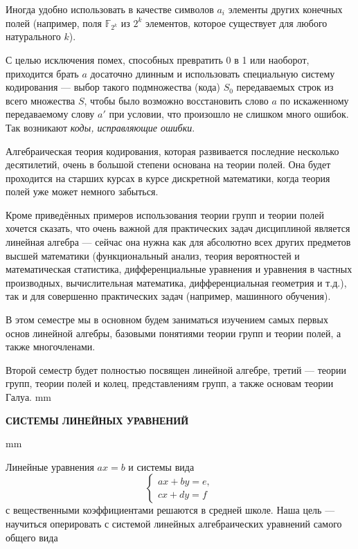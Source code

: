 \documentclass[12pt,english,russian]{article}
\begin{document}
	Иногда удобно использовать в качестве символов $a_i$ элементы других конечных полей (например, поля $\mathbb F_{2^k}$
	из $2^k$ элементов, которое существует для любого натурального $k$).

	С целью исключения помех, способных превратить 0 в 1 или
	наоборот, приходится брать $a$ досаточно длинным и использовать
	специальную систему кодирования --- выбор такого подмножества (кода)
	$S_0$ передаваемых строк из всего множества $S$, чтобы было возможно восстановить слово $a$
	по искаженному передаваемому слову
	$a'$ при условии, что произошло не слишком много ошибок.
	Так возникают \textit{коды, исправляющие ошибки}.

	Алгебраическая теория кодирования, которая развивается последние 
	несколько десятилетий, очень в большой степени основана 
	на теории полей. Она будет проходится на старших курсах
	в курсе дискретной математики, когда теория полей уже может
	немного забыться.

	Кроме приведённых примеров использования теории групп и
	теории полей хочется сказать, что очень важной для практических 
	задач дисциплиной является линейная алгебра --- сейчас она
	нужна как для абсолютно всех других предметов высшей математики 
	(функциональный анализ, теория вероятностей и математическая 
	статистика, дифференциальные уравнения и уравнения в
	частных производных, вычислительная математика, дифференциальная геометрия и т.д.), так и для совершенно практических
	задач (например, машинного обучения).


	В этом семестре мы в основном будем заниматься изучением
	самых первых основ линейной алгебры, базовыми понятиями теории 
	групп и теории полей, а также многочленами.

	Второй семестр будет полностью посвящен линейной алгебре,
	третий --- теории групп, теории полей и колец, представлениям
	групп, а также основам теории Галуа.
	 mm
	\begin{center}
		{\large {\bf СИСТЕМЫ ЛИНЕЙНЫХ УРАВНЕНИЙ }  }
	\end{center}
	 mm

	
	Линейные уравнения $ax = b$ и системы вида
	$$
		\begin{cases}
			ax + by =e,\\
			cx + dy = f
		\end{cases}
	$$
	с вещественными коэффициентами решаются в средней школе.
	Наша цель --- научиться оперировать с системой линейных алгебраических 
	уравнений самого общего вида
\end{document}
